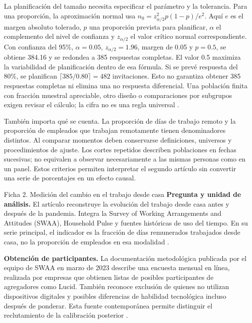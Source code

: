 {La planificación del tamaño necesita especificar el parámetro y la tolerancia. Para una proporción, la aproximación normal usa $n_0=z_{\alpha/2}^{2}p(1-p)/e^2$. Aquí $e$ es el margen absoluto tolerado, $p$ una proporción prevista para planificar, $\alpha$ el complemento del nivel de confianza y $z_{\alpha/2}$ el valor crítico normal correspondiente. Con confianza del 95\%, $\alpha=0.05$, $z_{\alpha/2}=1.96$, margen de 0.05 y $p=0.5$, se obtiene 384.16 y se redondea a 385 respuestas completas. El valor 0.5 maximiza la variabilidad de planificación dentro de esa fórmula. Si se prevé respuesta del 80\%, se planifican $\lceil385/0.80\rceil=482$ invitaciones. Esto no garantiza obtener 385 respuestas completas ni elimina una no respuesta diferencial. Una población finita con fracción muestral apreciable, otro diseño o comparaciones por subgrupos exigen revisar el cálculo; la cifra no es una regla universal \citep[sec.~8.3]{holmesBusiness2023}.

También importa qué se cuenta. La proporción de días de trabajo remoto y la proporción de empleados que trabajan remotamente tienen denominadores distintos. Al comparar momentos deben conservarse definiciones, universos y procedimientos de ajuste. Los cortes repetidos describen poblaciones en fechas sucesivas; no equivalen a observar necesariamente a las mismas personas como en un panel. Estos criterios permiten interpretar el segundo artículo sin convertir una serie de porcentajes en un efecto causal.

\begin{fichainvestigacion}{Ficha 2. Medición del cambio en el trabajo desde casa}
\textbf{Pregunta y unidad de análisis.} El artículo reconstruye la evolución del trabajo desde casa antes y después de la pandemia. Integra la Survey of Working Arrangements and Attitudes (SWAA), Household Pulse y fuentes históricas de uso del tiempo. En su serie principal, el indicador es la fracción de días remunerados trabajados desde casa, no la proporción de empleados en esa modalidad \citep{barrero2023}.

\textbf{Obtención de participantes.} La documentación metodológica publicada por el equipo de SWAA en marzo de 2023 describe una encuesta mensual en línea, realizada por empresas que obtienen listas de posibles participantes de agregadores como Lucid. También reconoce exclusión de quienes no utilizan dispositivos digitales y posibles diferencias de habilidad tecnológica incluso después de ponderar. Esta fuente contemporánea permite distinguir el reclutamiento de la calibración posterior \citep[diaps.~3--4]{wfhMetodos2023}.


\end{fichainvestigacion}}
